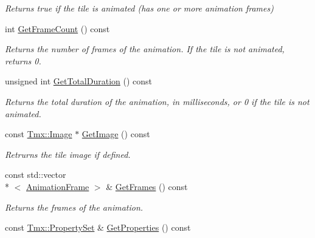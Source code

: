 \begin{DoxyCompactItemize}
\begin{DoxyCompactList}\small\item\em Returns true if the tile is animated (has one or more animation frames) \end{DoxyCompactList}\item 
\hypertarget{classTmx_1_1Tile_a622a7fd2afa260652aed512e09e988dc}{int \hyperlink{classTmx_1_1Tile_a622a7fd2afa260652aed512e09e988dc}{Get\-Frame\-Count} () const }\label{classTmx_1_1Tile_a622a7fd2afa260652aed512e09e988dc}

\begin{DoxyCompactList}\small\item\em Returns the number of frames of the animation. If the tile is not animated, returns 0. \end{DoxyCompactList}\item 
unsigned int \hyperlink{classTmx_1_1Tile_a06cd238d0fd53822ef1487498a890944}{Get\-Total\-Duration} () const 
\begin{DoxyCompactList}\small\item\em Returns the total duration of the animation, in milliseconds, or 0 if the tile is not animated. \end{DoxyCompactList}\item 
\hypertarget{classTmx_1_1Tile_aa7a6ad2d344f32f88e1a88c06edc4c3f}{const \hyperlink{classTmx_1_1Image}{Tmx\-::\-Image} $\ast$ \hyperlink{classTmx_1_1Tile_aa7a6ad2d344f32f88e1a88c06edc4c3f}{Get\-Image} () const }\label{classTmx_1_1Tile_aa7a6ad2d344f32f88e1a88c06edc4c3f}

\begin{DoxyCompactList}\small\item\em Retrurns the tile image if defined. \end{DoxyCompactList}\item 
\hypertarget{classTmx_1_1Tile_af46d006ea914db476b90d0866a12564d}{const std\-::vector\\*
$<$ \hyperlink{classTmx_1_1AnimationFrame}{Animation\-Frame} $>$ \& \hyperlink{classTmx_1_1Tile_af46d006ea914db476b90d0866a12564d}{Get\-Frames} () const }\label{classTmx_1_1Tile_af46d006ea914db476b90d0866a12564d}

\begin{DoxyCompactList}\small\item\em Returns the frames of the animation. \end{DoxyCompactList}\item 
\hypertarget{classTmx_1_1Tile_aa5cc1be340fa012e16c6ed62fb84f908}{const \hyperlink{classTmx_1_1PropertySet}{Tmx\-::\-Property\-Set} \& \hyperlink{classTmx_1_1Tile_aa5cc1be340fa012e16c6ed62fb84f908}{Get\-Properties} () const }\label{classTmx_1_1Tile_aa5cc1be340fa012e16c6ed62fb84f908}


\end{DoxyCompactItemize}
